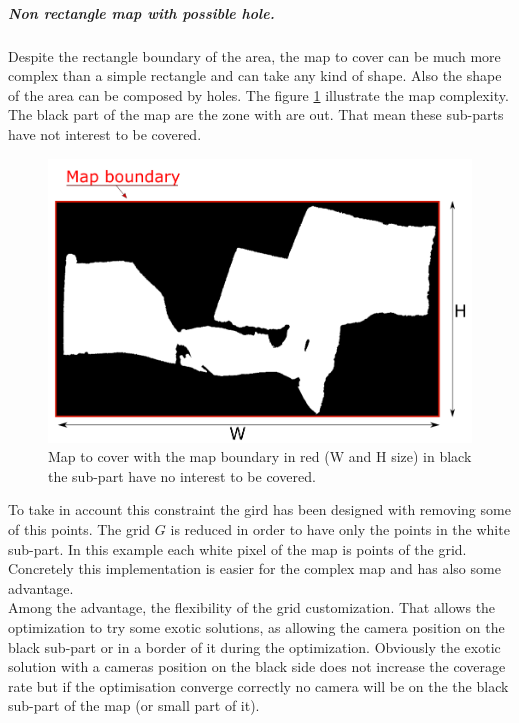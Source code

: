  \subparagraph{Non rectangle map with possible hole.} \label{subPara:MapConstraintAndObstacle}
Despite the rectangle boundary of the area, the map to cover can be much more complex than a simple rectangle and can take any kind of shape. Also the shape of the area can be composed by holes. The figure \ref{fig:boundaryMap} illustrate the map complexity. The black part of the map are the zone with are out. That mean these sub-parts have not interest to be covered.
 \begin{figure}[t!]
 \begin{center}
   \includegraphics[width=\linewidth]{img/BoundaryMap2.png}
  \caption{Map to cover with the map boundary in red (W and H size) in black the sub-part have no interest to  be covered.   }\label{fig:boundaryMap}
  \endminipage\hfill
  \end{center}
\end{figure}
To take in account this constraint the gird has been designed with removing some of this points.
The grid $G$ is reduced in order to have only the points in the white sub-part. In this example each white pixel of the map is points of the grid. 
Concretely this implementation is easier for the complex map and has also some advantage. \\
Among the advantage, the flexibility of the grid customization. That allows the optimization to try some exotic solutions, as allowing the camera  position on the black sub-part or in a border of it during the optimization.  Obviously the exotic solution with a cameras position on the black side does not increase the coverage rate  but if the optimisation converge correctly no camera will be on the the black sub-part of the map (or small part of it).

